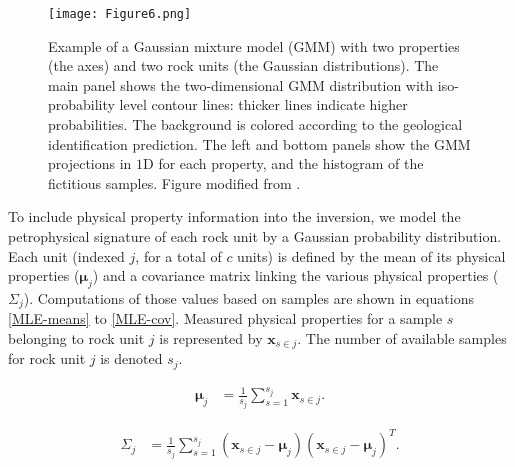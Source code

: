 \documentclass[paper, twocolumn]{geophysics} %
\begin{document}
\begin{figure}[!ht]
\centering
\texttt{[image: Figure6.png]}
\caption{Example of a Gaussian mixture model (GMM) with two properties (the axes) and two rock units (the Gaussian distributions). The main panel shows the two-dimensional GMM distribution with iso-probability level contour lines: thicker lines indicate higher probabilities. The background is colored according to the geological identification prediction. The left and bottom panels show the GMM projections in $1$D for each property, and the histogram of the fictitious samples. Figure modified from \citet{AsticJoint}.}
\label{fig:Figure6.png}
\end{figure}

To include physical property information into the inversion, we model the petrophysical signature of each rock unit by a Gaussian probability distribution. Each unit (indexed $j$, for a total of $c$ units) is defined by the mean of its physical properties ($\mathbf{\mu}_j$) and a covariance matrix linking the various physical properties ($\Sigma_j$). Computations of those values based on samples are shown in equations \ref{MLE-means} to \ref{MLE-cov}. Measured physical properties for a sample $s$ belonging to rock unit $j$ is represented by $\mathbf{x}_{s \in j}$. The number of available samples for rock unit $j$ is denoted $s_j$.



\begin{align}
\mathbf{\mu}_j &= \frac{1}{s_j}\sum_{s=1}^{s_j}\mathbf{x}_{s \in j}.
\label{MLE-means}
\end{align}

\begin{align}
\Sigma_j & = \frac{1}{s_j}\sum_{s=1}^{s_j}(\mathbf{x}_{s \in j}-\mathbf{\mu}_j)(\mathbf{x}_{s \in j}-\mathbf{\mu}_j)^T.
\label{MLE-cov}
\end{align}
\end{document}
